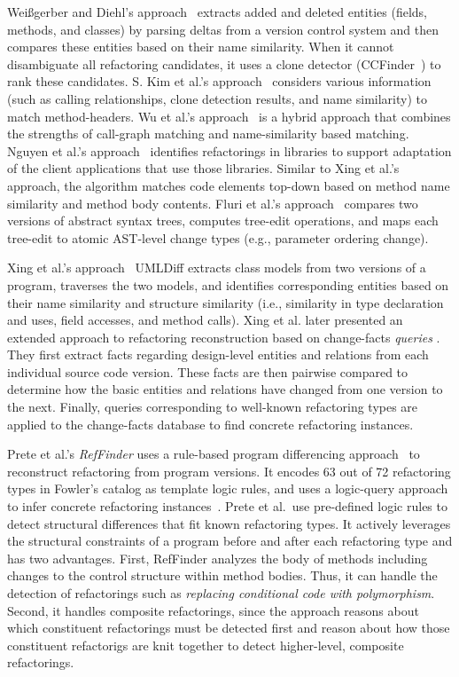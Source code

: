 \documentclass[runningheads,a4paper]{llncs}
\begin{document}
Wei{\ss}gerber and Diehl's approach~\cite{Weissgerber2006} extracts added and deleted entities (fields, methods, and classes) by parsing deltas from a version control system and then compares these entities based on their {name similarity}. When it cannot disambiguate all refactoring candidates, it uses a {clone detector} (CCFinder~\cite{Kamiya2002}) to rank these candidates. S. Kim et al.'s approach~\cite{SKim2005} considers various information (such as {calling relationships}, {clone detection} results, and {name similarity}) to match method-headers.  Wu et al.'s approach~\cite{Wu2010:aura} is a hybrid approach that combines the strengths of {call-graph matching} and {name-similarity} based matching. Nguyen et al.'s approach~\cite{Nguyen2010:libsync} identifies refactorings in libraries to support adaptation of the client applications that use those libraries. Similar to Xing et al.'s approach, the algorithm matches code elements top-down based on method name similarity and method body contents. Fluri et al.'s approach~\cite{Fluri2007} compares two versions of abstract syntax trees, computes tree-edit operations, and maps each tree-edit to atomic AST-level change types (e.g., parameter ordering change).

Xing et al.'s approach~\cite{Xing2005} UMLDiff extracts class models from two versions of a program, traverses the two models, and identifies corresponding entities based on their {name similarity} and {structure similarity} {(i.e., similarity in type declaration and uses, field accesses, and method calls)}.
Xing {et al.} later presented an extended approach to refactoring reconstruction based on change-facts {\em queries} \cite{Eleni01}. They first extract facts regarding design-level entities and relations from each individual source code version. These facts are then pairwise compared to determine how the basic entities and relations have changed from one version to the next. Finally, queries corresponding to well-known refactoring types are applied to the change-facts database to find concrete refactoring instances.

Prete et al.'s {\em RefFinder} uses a rule-based program differencing approach~\cite{Prete2010:reffinder,Kim2010:reffinder} to reconstruct refactoring from program versions. It encodes 63 out of 72 refactoring types in Fowler's catalog as template logic rules, and uses a logic-query approach to infer concrete refactoring instances~\cite{Prete2010:reffinder}. Prete et al.~use pre-defined logic rules to detect structural differences that fit known refactoring types. It actively leverages the structural constraints of a program before and after each refactoring type and has two advantages. First, RefFinder analyzes the body of methods including changes to the control structure within method bodies. Thus, it can handle the detection of refactorings such as {\it replacing conditional code with polymorphism}. Second, it handles composite refactorings, since the approach reasons about which constituent refactorings must be detected first and reason about how those constituent refactorigs are knit together to detect higher-level, composite refactorings.
\end{document}
